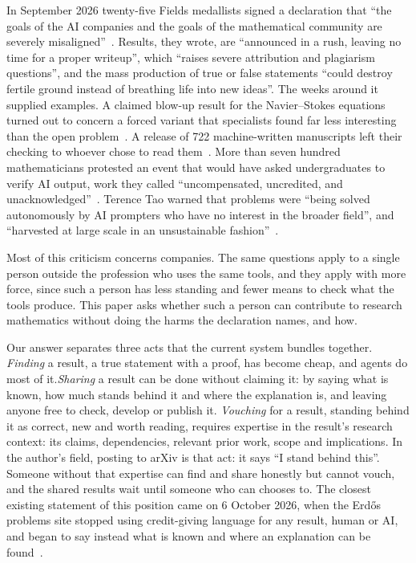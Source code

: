 \documentclass[11pt]{amsart}
\begin{document}
In September 2026 twenty-five Fields medallists signed a declaration that ``the
goals of the AI companies and the goals of the mathematical community are
severely misaligned''~\cite{fields-letter}. Results, they wrote, are
``announced in a rush, leaving no time for a proper writeup'', which ``raises
severe attribution and plagiarism questions'', and the mass production of true
or false statements ``could destroy fertile ground instead of breathing life
into new ideas''. The weeks around it supplied examples. A claimed blow-up
result for the Navier--Stokes equations turned out to concern a forced variant
that specialists found far less interesting than the open
problem~\cite{sciam-ns}. A release of 722 machine-written manuscripts left
their checking to whoever chose to read them~\cite{openai-math}. More than
seven hundred mathematicians protested an event that would have asked
undergraduates to verify AI output, work they called ``uncompensated,
uncredited, and unacknowledged''~\cite{caltech-letter}. Terence Tao warned that
problems were ``being solved autonomously by AI prompters who have no interest
in the broader field'', and ``harvested at large scale in an unsustainable
fashion''~\cite{tao-mathstodon}.

Most of this criticism concerns companies. The same questions apply to a single
person outside the profession who uses the same tools, and they apply with more
force, since such a person has less standing and fewer means to check what the
tools produce. This paper asks whether such a person can contribute to research
mathematics without doing the harms the declaration names, and how.

Our answer separates three acts that the current system bundles together.
\emph{Finding} a result, a true statement with a proof, has become cheap, and
agents do most of it.\@ \emph{Sharing} a result can be done without claiming
it: by saying what is known, how much stands behind it and where the
explanation is, and leaving anyone free to check, develop or publish it.\@
\emph{Vouching} for a result, standing behind it as correct, new and worth
reading, requires expertise in the result's research context: its claims,
dependencies, relevant prior work, scope and implications. In the author's
field, posting to arXiv is that act: it says ``I stand behind this''. Someone
without that expertise can find and share honestly but cannot vouch, and the
shared results wait until someone who can chooses to. The closest existing
statement of this position came on 6 October 2026, when the Erdős problems site
stopped using credit-giving language for any result, human or AI, and began to
say instead what is known and where an explanation can be
found~\cite{bloom-erdos}.
\end{document}
